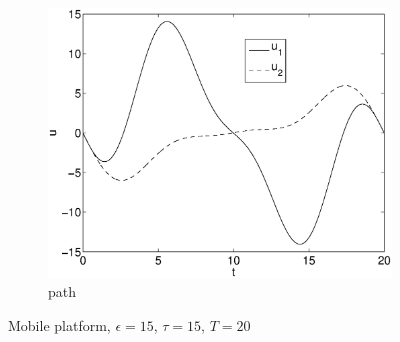 \begin{figure}[h]
\begin{subfigure}[b]{\textwidth}
\centering
\includegraphics[height=0.3\textheight]{img/final_15_15_20_u.eps}
\caption{path}
\end{subfigure}
\caption{Mobile platform, $\epsilon=15$, $\tau=15$, $T=20$}
\label{fig:pl4}
\end{figure}

